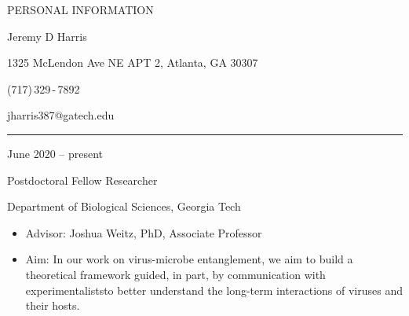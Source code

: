 \documentclass[a4paper,10pt]{article}
\newlength{\cvcolumngapwidth}
\newlength{\cvleftcolumnwidth}
\newlength{\cvrightcolumnwidth}
\newcommand{\cvnamestyle}[1]{{\Large\cvnamefont\textcolor{cvnamecolor}{#1}}}
\newcommand{\cvsectionstyle}[1]{{\normalsize\cvsectionfont\textcolor{cvsectioncolor}{#1}}}
\newcommand{\cvtitlestyle}[1]{{\large\cvtitlefont\textcolor{cvtitlecolor}{#1}}}
\newcommand{\cvdurationstyle}[1]{{\small\cvdurationfont\textcolor{cvdurationcolor}{#1}}}
\newlength{\cvafteritemskipamount}
\newlength{\cvaftersectionskipamount}
\newlength{\cvafternameskipamount}
\newlength{\cvafterpersonalinfolineskipamount}
\newlength{\cvaftertitleskipamount}
\newlength{\cvparskip}
\newcommand{\cvpersonalinfo}[2]{
    \begin{minipage}[t]{\cvleftcolumnwidth}
        \vspace{0mm} %
        \raggedleft #1
    \end{minipage}%
    \hspace{\cvcolumngapwidth}%
    \begin{minipage}[t]{\cvrightcolumnwidth}
        \vspace{0mm} %
        #2
    \end{minipage}

    \vspace{\cvafteritemskipamount}
}
\newcommand{\cvname}[1]{
    \cvnamestyle{#1}

    \vspace{\cvafternameskipamount}
}
\newcommand{\cvpersonalinfolinewithicon}[3]{
    \raisebox{.5\fontcharht\font`E-.5\height}{\texttt{[image: \#2]}}
    #3

    \vspace{\cvafterpersonalinfolineskipamount}
}
\newcommand{\cvsection}[1]{
    \begin{minipage}[t]{\cvleftcolumnwidth}
        \raggedleft\cvsectionstyle{#1}
    \end{minipage}%
    \hspace{\cvcolumngapwidth}%
    \begin{minipage}[t]{\cvrightcolumnwidth}
        \textcolor{cvrulecolor}{\rule{\cvrightcolumnwidth}{0.3mm}}
    \end{minipage}

    \vspace{\cvaftersectionskipamount}
}
\newcommand{\cvitem}[2]{
    \begin{minipage}[t]{\cvleftcolumnwidth}
        \raggedleft #1
    \end{minipage}%
    \hspace{\cvcolumngapwidth}%
    \begin{minipage}[t]{\cvrightcolumnwidth}
        \setlength{\parskip}{\cvparskip} #2
    \end{minipage}

    \vspace{\cvafteritemskipamount}
}
\newcommand{\cvtitle}[1]{
    \cvtitlestyle{#1}

    \vspace{\cvaftertitleskipamount}
    \vspace{-\cvparskip}
}
\begin{document}

\cvpersonalinfo{
    \cvsectionstyle{PERSONAL INFORMATION}
}{
    \cvname{Jeremy D Harris}

    \cvpersonalinfolinewithicon{height=4mm}{resources/europasscv-icons/address_europass_icon.pdf}{
1325 McLendon Ave NE APT 2, Atlanta, GA 30307
    }

    \cvpersonalinfolinewithicon{height=4mm}{resources/europasscv-icons/mobile_europass_icon.pdf}{
        (717)\,329\,-\,7892
    }

    \cvpersonalinfolinewithicon{height=4mm}{resources/europasscv-icons/mail_europass_icon.pdf}{
        jharris387@gatech.edu
    }


}



\cvsection{WORK EXPERIENCE}

\cvitem{
    \cvdurationstyle{June 2020 -- present}
}{
    \cvtitle{Postdoctoral Fellow Researcher}

	Department of Biological Sciences, Georgia Tech %

    \begin{itemize}[leftmargin=*]
    	\item Advisor: Joshua Weitz, PhD, Associate Professor
        \item Aim: In our work on virus-microbe entanglement, we aim to build a theoretical framework \textemdash guided, in part, by communication with experimentalists\textemdash to better understand the long-term interactions of viruses and their hosts.

    \end{itemize}
}
\end{document}
